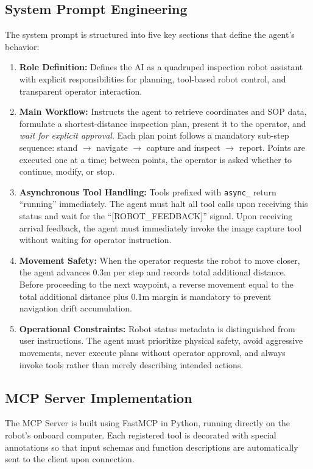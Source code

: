 \documentclass[conference]{IEEEtran}
\begin{document}
\subsection{System Prompt Engineering}
The system prompt is structured into five key sections that define the agent's behavior:
\begin{enumerate}
    \item \textbf{Role Definition:} Defines the AI as a quadruped inspection robot assistant with explicit responsibilities for planning, tool-based robot control, and transparent operator interaction.
    \item \textbf{Main Workflow:} Instructs the agent to retrieve coordinates and SOP data, formulate a shortest-distance inspection plan, present it to the operator, and \textit{wait for explicit approval}. Each plan point follows a mandatory sub-step sequence: stand $\rightarrow$ navigate $\rightarrow$ capture and inspect $\rightarrow$ report. Points are executed one at a time; between points, the operator is asked whether to continue, modify, or stop.
    \item \textbf{Asynchronous Tool Handling:} Tools prefixed with \texttt{async\_} return ``running'' immediately. The agent must halt all tool calls upon receiving this status and wait for the ``[ROBOT\_FEEDBACK]'' signal. Upon receiving arrival feedback, the agent must immediately invoke the image capture tool without waiting for operator instruction.
    \item \textbf{Movement Safety:} When the operator requests the robot to move closer, the agent advances 0.3m per step and records total additional distance. Before proceeding to the next waypoint, a reverse movement equal to the total additional distance plus 0.1m margin is mandatory to prevent navigation drift accumulation.
    \item \textbf{Operational Constraints:} Robot status metadata is distinguished from user instructions. The agent must prioritize physical safety, avoid aggressive movements, never execute plans without operator approval, and always invoke tools rather than merely describing intended actions.
\end{enumerate}

\subsection{MCP Server Implementation}
The MCP Server is built using FastMCP in Python, running directly on the robot's onboard computer. Each registered tool is decorated with special annotations so that input schemas and function descriptions are automatically sent to the client upon connection.
\end{document}
